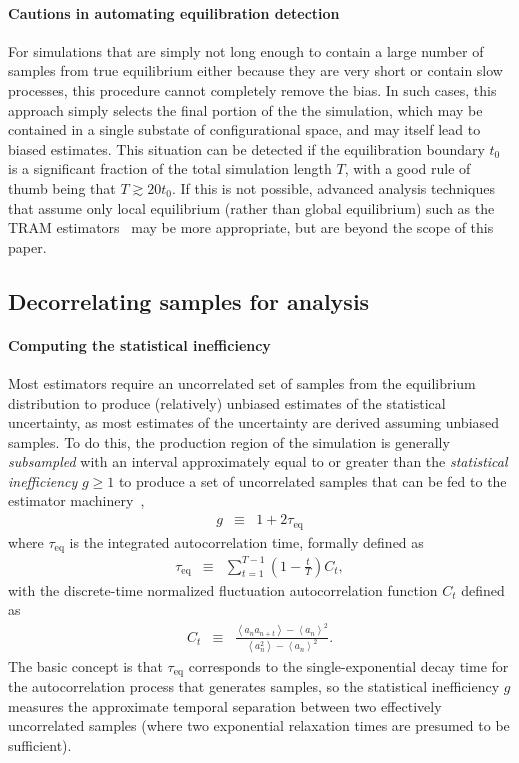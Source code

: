 \documentclass[9pt,bestpractices]{livecoms}
\newcommand{\expect}[1]{\left\langle{#1}\right\rangle}
\begin{document}
\paragraph{Cautions in automating equilibration detection}
For simulations that are simply not long enough to contain a large number of samples from true equilibrium either because they are very short or contain slow processes, this procedure cannot completely remove the bias.
In such cases, this approach simply selects the final portion of the the simulation, which may be contained in a single substate of configurational space, and may itself lead to biased estimates. 
This situation can be detected if the equilibration boundary $t_0$ is a significant fraction of the total simulation length $T$, with a good rule of thumb being that $T \gtrsim 20 t_0$.
If this is not possible, advanced analysis techniques that assume only local equilibrium (rather than global equilibrium) such as the TRAM estimators~\cite{mey2014xtram,wu2016multiensemble,nuske2017markov} may be more appropriate, but are beyond the scope of this paper. 

\subsection{Decorrelating samples for analysis}
\label{sec:decorrelating-samples}
\paragraph{Computing the statistical inefficiency}
Most estimators require an uncorrelated set of samples from the equilibrium distribution to produce (relatively) unbiased estimates of the statistical uncertainty, as most estimates of the uncertainty are derived assuming unbiased samples.
To do this, the production region of the simulation is generally \emph{subsampled} with an interval approximately equal to or greater than the \emph{statistical inefficiency} $g \ge 1$ to produce a set of uncorrelated samples that can be fed to the estimator machinery~\cite{chodera2016simple},
\begin{eqnarray}
g &\equiv& 1 + 2 \tau_\mathrm{eq} \label{eq:statistical-inefficiency-definition}
\end{eqnarray}
where $\tau_\mathrm{eq}$ is the integrated autocorrelation time, formally defined as
\begin{eqnarray}
\tau_\mathrm{eq} &\equiv& \sum_{t=1}^{T-1} \left(1 - \frac{t}{T}\right) C_t \label{eq:integrated-autocorrelation-time-definition} , 
\end{eqnarray}
with the discrete-time normalized fluctuation autocorrelation function $C_t$ defined as
\begin{eqnarray}
C_t &\equiv& \frac{\expect{a_n a_{n+t}} - \expect{a_n}^2}{\expect{a_n^2} - \expect{a_n}^2} . \label{equation:autocorrelation-definition}
\end{eqnarray}
The basic concept is that $\tau_\mathrm{eq}$ corresponds to the single-exponential decay time for the autocorrelation process that generates samples, so the statistical inefficiency $g$ measures the approximate temporal separation between two effectively uncorrelated samples (where two exponential relaxation times are presumed to be sufficient).
\end{document}
